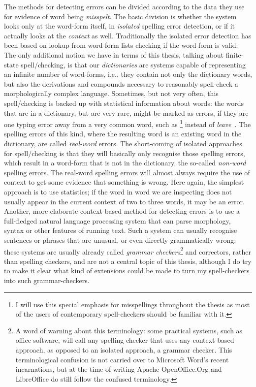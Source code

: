 \documentclass[officiallayout]{unihelcompling}
\newcommand\misspelt{\bgroup\markoverwith
{\textcolor{red}{\lower3.5pt\hbox{\sixly \char58}}}\ULon}
\begin{document}
The methods for detecting errors can be divided according to the data they use
for evidence of word being \emph{misspelt}. The basic division is whether the
system looks only at the word-form itself, in \emph{isolated} spelling error
detection, or if it actually looks at the \emph{context} as well. Traditionally
the isolated error detection has been based on lookup from word-form lists
checking if the word-form is valid. The only additional notion we have in terms
of this thesis, talking about finite-state spell\-/checking, is that our
\emph{dictionaries} are systems capable of representing an infinite number of
word-forms, i.e., they contain not only the dictionary words, but also the
derivations and compounds necessary to reasonably spell-check a morphologically
complex language. Sometimes, but not very often, this spell\-/checking is backed
up with statistical information about words: the words that are in a
dictionary, but are very rare, might be marked as errors, if they are one
typing error away from a very common word, such as \misspelt{lave}\footnote{I
    will use this special emphasis for misspellings throughout the thesis as
    most of the users of contemporary spell-checkers should be familiar with
it.} instead of \emph{leave}~\citep{kukich1992techniques}.  The spelling errors
of this kind, where the resulting word is an existing word in the dictionary,
are called \emph{real-word} errors.  The short-coming of isolated approaches
for spell\-/checking is that they will basically only recognise those spelling
errors, which result in a word-form that is not in the dictionary, the
so-called \emph{non-word} spelling errors. The real-word spelling errors will
almost always require the use of context to get some evidence that something is
wrong. Here again, the simplest approach is to use statistics; if the word in
word we are inspecting does not usually appear in the current context of two to
three words, it may be an error. Another, more elaborate context-based method
for detecting errors is to use a full-fledged natural language processing
system that can parse morphology, syntax or other features of running text.
Such a system can usually recognise sentences or phrases that are unusual, or
even directly grammatically wrong; these systems are usually already called
\emph{grammar checkers}\footnote{A word of warning about this terminology:
    some practical systems, such as office software, will call any spelling
    checker that uses any context based approach, as opposed to an isolated
    approach, a grammar checker. This terminological confusion is not carried
over to Microsoft Word's recent incarnations, but at the time of writing Apache
OpenOffice.Org and LibreOffice do still follow the confused terminology.} and
correctors, rather than spelling checkers, and are not a central topic of this
thesis, although I do try to make it clear what kind of extensions could be
made to turn my spell-checkers into such grammar-checkers.
\end{document}
